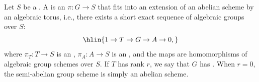 \begin{definition} \label{definition:semi_abelian_group_scheme_over_a_scheme}
    Let $S$ be a . A  is an  $\pi\colon G \to S$ that fits into an extension of an abelian scheme by an algebraic torus, i.e., there exists a short exact sequence of algebraic groups over $S$:
    $$\hlin{1 \to T \to G \to A \to 0,}$$
    where $\pi_T\colon T \to S$ is an , $\pi_A\colon A \to S$ is an , and the maps are homomorphisms of algebraic group schemes over $S$. If $T$ has rank $r$, we say that $G$ has . When $r = 0$, the semi-abelian group scheme is simply an abelian scheme.

\end{definition}